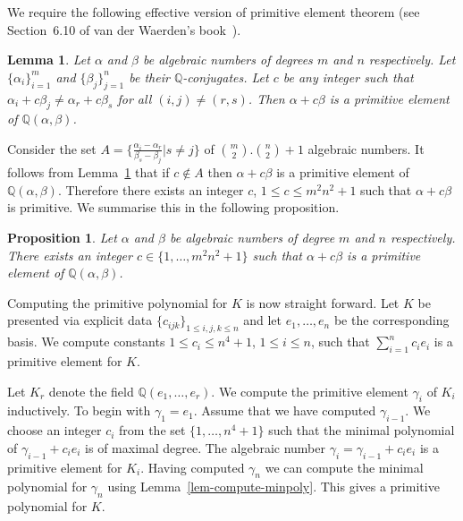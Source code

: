 \documentclass[11pt]{madras}%
\newtheorem{lemma}[theorem]{Lemma}
\newtheorem{proposition}[theorem]{Proposition}
\theoremstyle{remark}
\begin{document}
We require the following effective version of primitive element
theorem (see Section~6.10 of van der Waerden's
book~\cite{waerden:1991}).

\begin{lemma}\label{lem-combine-fields}
  Let $\alpha$ and $\beta$ be algebraic numbers of degrees $m$ and $n$
  respectively.  Let $\{ \alpha_i \}_{i=1}^m$ and $\{ \beta_j
  \}_{j=1}^n$ be their $\mathbb{Q}$-conjugates. Let $c$ be any integer
  such that $\alpha_i + c \beta_j \neq \alpha_r + c \beta_s$ for all
  $(i,j) \neq (r,s)$. Then $\alpha + c \beta$ is a primitive element
  of $\mathbb{Q}(\alpha,\beta)$.
\end{lemma}

Consider the set $A = \{ \frac{\alpha_i - \alpha_r}{\beta_s -
  \beta_j}| s \neq j \}$ of ${m \choose 2}.{n \choose 2} + 1$
algebraic numbers. It follows from Lemma~\ref{lem-combine-fields} that
if $c \not \in A$ then $\alpha + c \beta$ is a primitive element of
$\mathbb{Q}(\alpha,\beta)$. Therefore there exists an integer $c$, $1
\leq c \leq m^2 n^2 +1$ such that $\alpha + c\beta$ is primitive. We
summarise this in the following proposition.

\begin{proposition}\label{prop-combine-fields}
  Let $\alpha$ and $\beta$ be algebraic numbers of degree $m$ and $n$
  respectively. There exists an integer $c \in \{ 1, \ldots, m^2n^2+1
  \}$ such that $\alpha + c \beta$ is a primitive element of
  $\mathbb{Q}(\alpha,\beta)$.
\end{proposition}

Computing the primitive polynomial for $K$ is now straight forward.
Let $K$ be presented via explicit data $\{ c_{ijk} \}_{1 \leq i,j,k
  \leq n}$ and let $e_1,\ldots,e_n$ be the corresponding basis.  We
compute constants $1 \leq c_i \leq n^4 + 1$, $1 \leq i \leq n$, such
that $\sum_{i=1}^n c_i e_i$ is a primitive element for $K$.

Let $K_r$ denote the field $\mathbb{Q}(e_1,\ldots,e_r)$.  We compute
the primitive element $\gamma_i$ of $K_i$ inductively. To begin with
$\gamma_1 = e_1$. Assume that we have computed $\gamma_{i-1}$. We
choose an integer $c_i$ from the set $\{ 1, \ldots , n^4 +1 \}$ such
that the minimal polynomial of $\gamma_{i-1} + c_i e_i$ is of maximal
degree.  The algebraic number $\gamma_i = \gamma_{i-1} + c_i e_i$ is a
primitive element for $K_i$. Having computed $\gamma_n$ we can compute
the minimal polynomial for $\gamma_n$ using
Lemma~\ref{lem-compute-minpoly}. This gives a primitive polynomial for
$K$.
\end{document}
